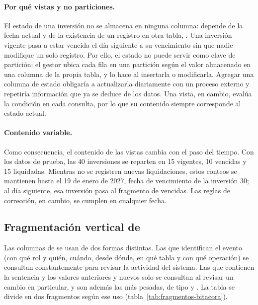 \paragraph{Por qué vistas y no particiones.} El estado de una inversión no se almacena en ninguna columna: depende de la fecha actual y de la existencia de un registro en otra tabla, . Una inversión vigente pasa a estar vencida el día siguiente a su vencimiento sin que nadie modifique un solo registro. Por ello, el estado no puede servir como clave de partición: el gestor ubica cada fila en una partición según el valor almacenado en una columna de la propia tabla, y lo hace al insertarla o modificarla. Agregar una columna de estado obligaría a actualizarla diariamente con un proceso externo y repetiría información que ya se deduce de los datos. Una vista, en cambio, evalúa la condición en cada consulta, por lo que su contenido siempre corresponde al estado actual.

\paragraph{Contenido variable.} Como consecuencia, el contenido de las vistas cambia con el paso del tiempo. Con los datos de prueba, las 40 inversiones se reparten en 15 vigentes, 10 vencidas y 15 liquidadas. Mientras no se registren nuevas liquidaciones, estos conteos se mantienen hasta el 19 de enero de 2027, fecha de vencimiento de la inversión 30; al día siguiente, esa inversión pasa al fragmento de vencidas. Las reglas de corrección, en cambio, se cumplen en cualquier fecha.

\subsection{Fragmentación vertical de }

Las columnas de  se usan de dos formas distintas. Las que identifican el evento (con qué rol y quién, cuándo, desde dónde, en qué tabla y con qué operación) se consultan constantemente para revisar la actividad del sistema. Las que contienen la sentencia y los valores anteriores y nuevos solo se consultan al revisar un cambio en particular, y son además las más pesadas, de tipo  y . La tabla se divide en dos fragmentos según ese uso (tabla~\ref{tab:fragmentos-bitacora}).

